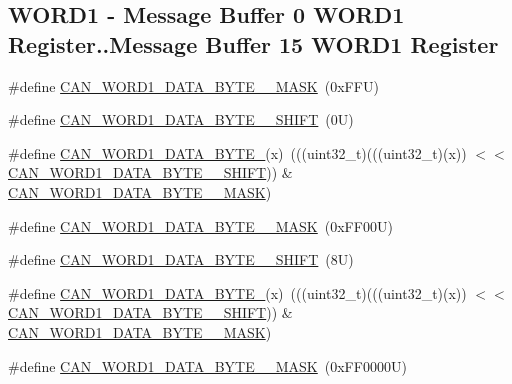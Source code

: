 \subsection*{W\+O\+R\+D1 -\/ Message Buffer 0 W\+O\+R\+D1 Register..Message Buffer 15 W\+O\+R\+D1 Register}
\begin{DoxyCompactItemize}
\item 
\#define \mbox{\hyperlink{group___c_a_n___register___masks_ga55f9bc8ccdbb2f34f1b571eff8481537}{C\+A\+N\+\_\+\+W\+O\+R\+D1\+\_\+\+D\+A\+T\+A\+\_\+\+B\+Y\+T\+E\+\_\+\_\+\+M\+A\+SK}}~(0x\+F\+F\+U)
\item 
\#define \mbox{\hyperlink{group___c_a_n___register___masks_gacff5d21eb80fe537f40b518e58750186}{C\+A\+N\+\_\+\+W\+O\+R\+D1\+\_\+\+D\+A\+T\+A\+\_\+\+B\+Y\+T\+E\+\_\+\_\+\+S\+H\+I\+FT}}~(0\+U)
\item 
\#define \mbox{\hyperlink{group___c_a_n___register___masks_gaf1fd0b43601dbb20b700e6bbe828712a}{C\+A\+N\+\_\+\+W\+O\+R\+D1\+\_\+\+D\+A\+T\+A\+\_\+\+B\+Y\+T\+E\+\_}}(x)~(((uint32\+\_\+t)(((uint32\+\_\+t)(x)) $<$$<$ \mbox{\hyperlink{group___c_a_n___register___masks_gacff5d21eb80fe537f40b518e58750186}{C\+A\+N\+\_\+\+W\+O\+R\+D1\+\_\+\+D\+A\+T\+A\+\_\+\+B\+Y\+T\+E\+\_\+\_\+\+S\+H\+I\+FT}})) \& \mbox{\hyperlink{group___c_a_n___register___masks_ga55f9bc8ccdbb2f34f1b571eff8481537}{C\+A\+N\+\_\+\+W\+O\+R\+D1\+\_\+\+D\+A\+T\+A\+\_\+\+B\+Y\+T\+E\+\_\+\_\+\+M\+A\+SK}})
\item 
\#define \mbox{\hyperlink{group___c_a_n___register___masks_ga2a3649044e37e695317cff5b42d9c4f1}{C\+A\+N\+\_\+\+W\+O\+R\+D1\+\_\+\+D\+A\+T\+A\+\_\+\+B\+Y\+T\+E\+\_\+\_\+\+M\+A\+SK}}~(0x\+F\+F00\+U)
\item 
\#define \mbox{\hyperlink{group___c_a_n___register___masks_gadfb68bcd398c238b56d716fa3a8ec4ee}{C\+A\+N\+\_\+\+W\+O\+R\+D1\+\_\+\+D\+A\+T\+A\+\_\+\+B\+Y\+T\+E\+\_\+\_\+\+S\+H\+I\+FT}}~(8\+U)
\item 
\#define \mbox{\hyperlink{group___c_a_n___register___masks_gac3aab1b91f004ba23493613f6e261bbc}{C\+A\+N\+\_\+\+W\+O\+R\+D1\+\_\+\+D\+A\+T\+A\+\_\+\+B\+Y\+T\+E\+\_}}(x)~(((uint32\+\_\+t)(((uint32\+\_\+t)(x)) $<$$<$ \mbox{\hyperlink{group___c_a_n___register___masks_gadfb68bcd398c238b56d716fa3a8ec4ee}{C\+A\+N\+\_\+\+W\+O\+R\+D1\+\_\+\+D\+A\+T\+A\+\_\+\+B\+Y\+T\+E\+\_\+\_\+\+S\+H\+I\+FT}})) \& \mbox{\hyperlink{group___c_a_n___register___masks_ga2a3649044e37e695317cff5b42d9c4f1}{C\+A\+N\+\_\+\+W\+O\+R\+D1\+\_\+\+D\+A\+T\+A\+\_\+\+B\+Y\+T\+E\+\_\+\_\+\+M\+A\+SK}})
\item 
\#define \mbox{\hyperlink{group___c_a_n___register___masks_ga9762ba9b3f8288f68e3db1e0d2deccaf}{C\+A\+N\+\_\+\+W\+O\+R\+D1\+\_\+\+D\+A\+T\+A\+\_\+\+B\+Y\+T\+E\+\_\+\_\+\+M\+A\+SK}}~(0x\+F\+F0000\+U)

\end{DoxyCompactItemize}
